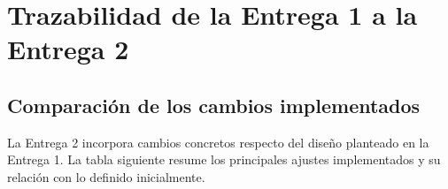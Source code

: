 \documentclass[11pt,letterpaper]{article}
\begin{document}
\section{Trazabilidad de la Entrega 1 a la Entrega 2}


\subsection{Comparación de los cambios implementados}

La Entrega 2 incorpora cambios concretos respecto del diseño planteado en la Entrega 1. La tabla siguiente resume los principales ajustes implementados y su relación con lo definido inicialmente.


\begingroup
\footnotesize
\setlength{\tabcolsep}{3.0pt}
\renewcommand{\arraystretch}{1.17}
\end{document}
